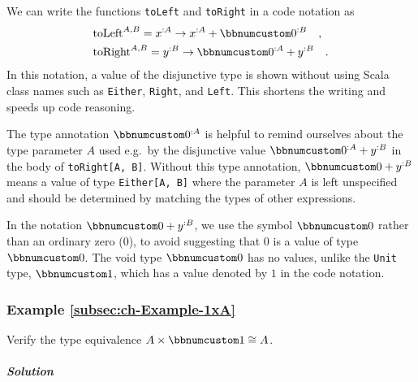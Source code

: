\noindent We can write the functions \lstinline!toLeft! and \lstinline!toRight!
in a code notation as 
\begin{align*}
 & \text{toLeft}^{A,B}=x^{:A}\rightarrow x^{:A}+\bbnum 0^{:B}\quad,\\
 & \text{toRight}^{A,B}=y^{:B}\rightarrow\bbnum 0^{:A}+y^{:B}\quad.
\end{align*}
In this notation, a value of the disjunctive type is shown without
using Scala class names such as \lstinline!Either!, \lstinline!Right!,
and \lstinline!Left!. This shortens the writing and speeds up code
reasoning.

The type annotation $\bbnum 0^{:A}$ is helpful to remind ourselves
about the type parameter $A$ used e.g.~by the disjunctive value
$\bbnum 0^{:A}+y^{:B}$ in the body of \lstinline!toRight[A, B]!.
Without this type annotation, $\bbnum 0+y^{:B}$ means a value of
type \lstinline!Either[A, B]! where the parameter $A$ is left unspecified
and should be determined by matching the types of other expressions.

In the notation $\bbnum 0+y^{:B}$, we use the symbol $\bbnum 0$
rather than an ordinary zero ($0$), to avoid suggesting that $0$
is a value of type $\bbnum 0$. The void type $\bbnum 0$ has no values,
unlike the \lstinline!Unit! type, $\bbnum 1$, which has a value
denoted by $1$ in the code notation.

\subsubsection{Example \label{subsec:ch-Example-1xA}\ref{subsec:ch-Example-1xA}}

Verify the type equivalence $A\times\bbnum 1\cong A$.

\subparagraph{Solution}

